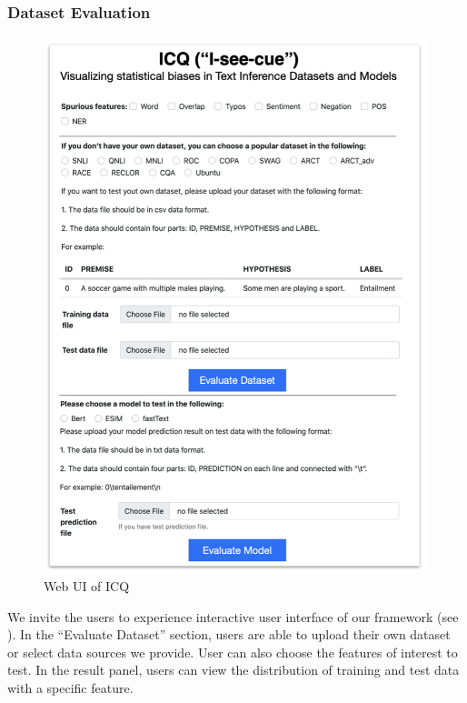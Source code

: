 \subsubsection{Dataset Evaluation}

\begin{figure}[th]
\centering
\includegraphics[width=1.0\columnwidth]{picture/dataset.jpg}
\caption{Web UI of ICQ}
\label{fig:dataset}
\end{figure}

We invite the users to experience interactive user interface of our 
framework (see ). 
In the ``Evaluate Dataset'' section,
users are able to upload their own dataset or select data sources we provide. 
User can also choose the features of interest to test.
In the result panel, users can view the distribution of training and test data  
with a specific feature. 




